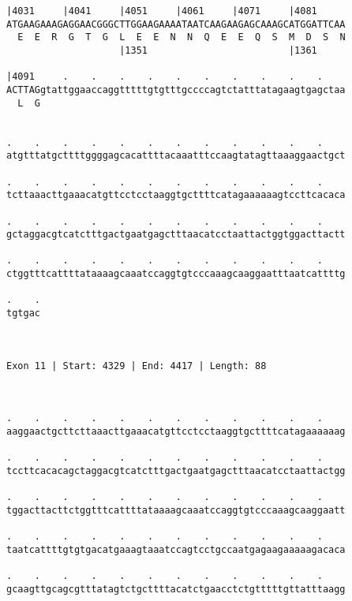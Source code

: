 \documentclass{article}
\begin{document}
\begin{Verbatim}
|4031     |4041     |4051     |4061     |4071     |4081     
ATGAAGAAAGAGGAACGGGCTTGGAAGAAAATAATCAAGAAGAGCAAAGCATGGATTCAA
  E  E  R  G  T  G  L  E  E  N  N  Q  E  E  Q  S  M  D  S  N
                    |1351                         |1361     
  
|4091     .    .    .    .    .    .    .    .    .    .    
ACTTAGgtattggaaccaggtttttgtgtttgccccagtctatttatagaagtgagctaa
  L  G                                                      
                                                            
  
.    .    .    .    .    .    .    .    .    .    .    .    
atgtttatgcttttggggagcacattttacaaatttccaagtatagttaaaggaactgct
                                                            
.    .    .    .    .    .    .    .    .    .    .    .    
tcttaaacttgaaacatgttcctcctaaggtgcttttcatagaaaaaagtccttcacaca
                                                            
.    .    .    .    .    .    .    .    .    .    .    .    
gctaggacgtcatctttgactgaatgagctttaacatcctaattactggtggacttactt
                                                            
.    .    .    .    .    .    .    .    .    .    .    .    
ctggtttcattttataaaagcaaatccaggtgtcccaaagcaaggaatttaatcattttg
                                                            
.    .
tgtgac
      
      
 
Exon 11 | Start: 4329 | End: 4417 | Length: 88



.    .    .    .    .    .    .    .    .    .    .    .    
aaggaactgcttcttaaacttgaaacatgttcctcctaaggtgcttttcatagaaaaaag
                                                            
.    .    .    .    .    .    .    .    .    .    .    .    
tccttcacacagctaggacgtcatctttgactgaatgagctttaacatcctaattactgg
                                                            
.    .    .    .    .    .    .    .    .    .    .    .    
tggacttacttctggtttcattttataaaagcaaatccaggtgtcccaaagcaaggaatt
                                                            
.    .    .    .    .    .    .    .    .    .    .    .    
taatcattttgtgtgacatgaaagtaaatccagtcctgccaatgagaagaaaaagacaca
                                                            
.    .    .    .    .    .    .    .    .    .    .    .    
gcaagttgcagcgtttatagtctgcttttacatctgaacctctgtttttgttatttaagg
                                                            

\end{Verbatim}
\end{document}

